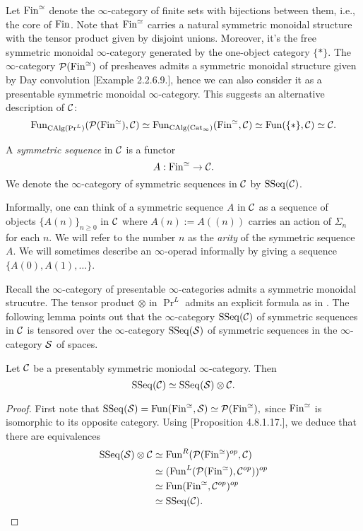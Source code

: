Let $\operatorname{Fin}^{\simeq}$ denote the $\infty$-category of finite sets with bijections between them, i.e., the core of $\operatorname{Fin}$. 
Note that $\operatorname{Fin}^{\simeq}$ carries a natural symmetric monoidal structure with the tensor product given by disjoint unions. 
Moreover, it's the free symmetric monoidal $\infty$-category generated by the one-object category $\{*\}$.
The $\infty$-category ${\mathcal{P}}(\operatorname{Fin}^{\simeq})$ of presheaves admits a symmetric monoidal structure given by Day convolution \cite{HA}[Example 2.2.6.9.], hence we can also consider it as a presentable symmetric monoidal $\infty$-category. This suggests an alternative description of ${\mathcal{C}}$:
\[
\operatorname{Fun}_{\operatorname{CAlg}(\Pr^L)}({\mathcal{P}}(\operatorname{Fin}^{\simeq}), {\mathcal{C}}) 
\simeq 
\operatorname{Fun}_{\operatorname{CAlg}(\operatorname{Cat}_{\infty})} (\operatorname{Fin}^{\simeq}, {\mathcal{C}})
\simeq
\operatorname{Fun}(\{*\}, {\mathcal{C}})
\simeq 
{\mathcal{C}}.
\]


\begin{definition}
	A \emph{symmetric sequence} in ${\mathcal{C}}$ is a functor 
	$$
	A:\operatorname{Fin}^{\simeq} \to {\mathcal{C}}.
	$$ We denote the $\infty$-category of symmetric sequences in ${\mathcal{C}}$ by $\operatorname{SSeq}({\mathcal{C}})$.
\end{definition}
\begin{remark}
	Informally, one can think of a symmetric sequence $A$ in ${\mathcal{C}}$ as a sequence of objects $\{A(n)\}_{n\geq 0}$ in ${\mathcal{C}}$ where $A(n):= A((n))$ carries an action of $\Sigma_n$ for each $n$.
	We will refer to the number $n$ as the \emph{arity} of the symmetric sequence $A$. We will sometimes describe an $\infty$-operad informally by giving a sequence $\{A(0), A(1), \dots \}$.
	
\end{remark}
Recall the $\infty$-category of presentable $\infty$-categories admits a symmetric monoidal strucutre. The tensor product $\otimes$ in $\Pr^L$ admits an explicit formula as in \cite[Proposition 4.8.1.17.]{HA}. The following lemma points out that the $\infty$-category $\operatorname{SSeq}({\mathcal{C}})$ of symmetric sequences in ${\mathcal{C}}$ is tensored over the $\infty$-category $\operatorname{SSeq}(\operatorname{\mathcal{S}})$ of symmetric sequences in the $\infty$-category ${\mathcal{S}}$ of spaces.
\begin{lemma}
	 Let ${\mathcal{C}}$ be a presentably symmetric moniodal $\infty$-category.
	Then
	$$
	\operatorname{SSeq}({\mathcal{C}}) \simeq \operatorname{SSeq}(\operatorname{\mathcal{S}})\otimes {\mathcal{C}}.
	$$
\end{lemma}
\begin{proof}
First note that 
$
\operatorname{SSeq}(\operatorname{\mathcal{S}})=\operatorname{Fun}(\operatorname{Fin}^{\simeq}, \operatorname{\mathcal{S}})\simeq {\mathcal{P}}(\operatorname{Fin}^{\simeq}),
$
since $\operatorname{Fin}^{\simeq}$ is isomorphic to its opposite category.
Using \cite{HA}[Proposition 4.8.1.17.], we deduce that there are equivalences
\begin{align*}
	\operatorname{SSeq}(\operatorname{\mathcal{S}})\otimes {\mathcal{C}} 
& \simeq 
\operatorname{Fun}^R({\mathcal{P}}(\operatorname{Fin}^{\simeq})^{op},{\mathcal{C}})\\
&\simeq
(\operatorname{Fun}^{L}({\mathcal{P}}(\operatorname{Fin}^{\simeq}), {\mathcal{C}}^{op}))^{op}\\
& \simeq
\operatorname{Fun}(\operatorname{Fin}^{\simeq},{\mathcal{C}}^{op}) ^{op}\\
& \simeq \operatorname{SSeq}({\mathcal{C}}).
\end{align*}



\end{proof}

